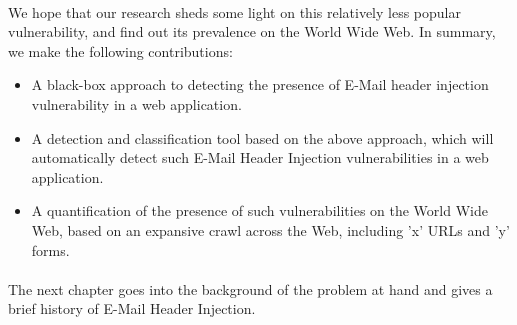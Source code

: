 \paragraph{} %
We hope that our research sheds some light on this relatively less popular vulnerability, and find out its prevalence on the World Wide Web. In summary, we make the following contributions:
\begin{itemize}
	
	\item{A black-box approach to detecting the presence of E-Mail header injection vulnerability in a web application.}
	
	\item{A detection and classification tool based on the above approach, which will automatically detect such E-Mail Header Injection vulnerabilities in a web application.}
	
	\item{A quantification of the presence of such vulnerabilities on the World Wide Web, based on an expansive crawl across the Web, including {'x'} URLs and {'y'} forms.}
	
\end{itemize}

\paragraph{}
The next chapter goes into the background of the problem at hand and gives a brief history of E-Mail Header Injection.
